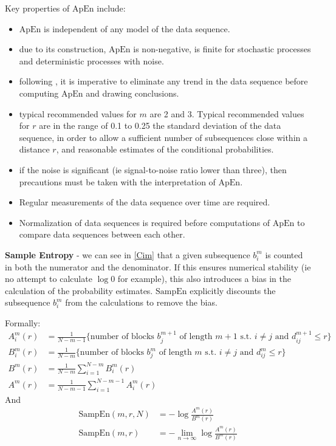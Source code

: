 Key properties of $\text{ApEn}$ include:
\begin{itemize}
    \item $\text{ApEn}$ is independent of any model of the data sequence.
    \item due to its construction, $\text{ApEn}$ is non-negative, is finite for stochastic processes and deterministic processes with noise.
    \item following \cite{pincus_approximate_1991}, it is imperative to eliminate any trend in the data sequence before computing $\text{ApEn}$ and drawing conclusions.
    \item typical recommended values for $m$ are 2 and 3. Typical recommended values for $r$ are in the range of 0.1 to 0.25 the standard deviation of the data sequence, in order to allow a sufficient number of subsequences close within a distance $r$, and reasonable estimates of the conditional probabilities.
    \item if the noise is significant (ie signal-to-noise ratio lower than three), then precautions must be taken with the interpretation of $\text{ApEn}$.
    \item Regular measurements of the data sequence over time are required.
    \item Normalization of data sequences is required before computations of $\text{ApEn}$ to compare data sequences between each other.
\end{itemize}

\textbf{Sample Entropy} - we can see in \ref{Cim} that a given subsequence $b_i^m$ is counted in both the numerator and the denominator. If this ensures numerical stability (ie no attempt to calculate $\log{0}$ for example), this also introduces a bias in the calculation of the probability estimates. $\text{SampEn}$ explicitly discounts the subsequence $b_i^m$ from the calculations to remove the bias.

Formally:
\begin{align}
    A_i^m(r) &= \frac{1}{N-m-1} \{ \text{number of blocks $b_j^{m+1}$  of length $m+1$ s.t. $i \neq j$ and $d_{ij}^{m+1} \leq r$} \} \\
    B_i^m(r) &= \frac{1}{N-m} \{\text{number of blocks $b_j^m$ of length $m$ s.t. $i \neq j$ and $d_{ij}^m \leq r$} \} \\
    B^m(r) &= \frac{1}{N-m} \sum_{i=1}^{N-m} B_i^m(r) \\
    A^m(r) &= \frac{1}{N-m-1} \sum_{i=1}^{N-m-1} A_i^m(r)
\end{align}
And
\begin{align}
    \text{SampEn}(m,r,N) &= -\log{\frac{A^m(r)}{B^m(r)}} \\
    \text{SampEn}(m,r) &= - \underset{n \rightarrow \infty}{\lim } \log{\frac{A^m(r)}{B^m(r)}}
\end{align}


